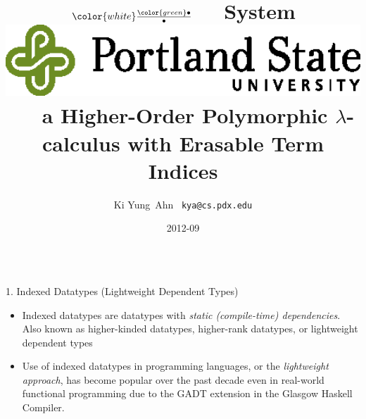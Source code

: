 \documentclass[final]{beamer}
\title[System \Fi]{
  {\VERYHuge$\color{white}\frac{\color{green}\bullet}{\bullet}$\qquad\quad~~}
  {\VERYHuge System \Fi}
  \qquad\includegraphics[width=23cm]{psulogo_horiz_spot} \\
{\huge ~~ a Higher-Order Polymorphic $\lambda$-calculus with Erasable Term Indices}
  }
\author[Ki Yung Ahn]{ Ki Yung $\,$Ahn $\,$ {\Large\texttt{kya@cs.pdx.edu}} }
\institute[Portland State University]{
	Department of Computer Science\phantom{,} Portland State University }
\date{2012-09}
\begin{document}
\begin{frame}[fragile]
\begin{columns}[t]

\begin{column}{.485\linewidth}

\begin{block}{1. Indexed Datatypes
	{\normalsize(Lightweight Dependent Types)} }
\begin{itemize}
\item Indexed datatypes are datatypes
	with \emph{static (compile-time) dependencies}.
	Also known as higher-kinded datatypes, higher-rank datatypes,
	or lightweight dependent types
\item Use of indexed datatypes in programming languages,
	or the {\emph{lightweight approach}}, has become popular
	over the past decade even in real-world functional programming due to
	the GADT extension in the Glasgow Haskell Compiler.
\end{itemize}
\end{block}


\end{column}
\end{columns}
\end{frame}
\end{document}
